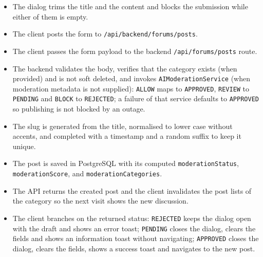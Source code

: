\begin{itemize}[leftmargin=1.6em,topsep=3pt,itemsep=2pt,parsep=0pt,label=$\bullet$]
      \item The dialog trims the title and the content and blocks the submission while
            either of them is empty.
      \item The client posts the form to \texttt{/api/backend/forums/posts}.
      \item The client passes the form payload to the backend \texttt{/api/forums/posts} route.
      \item The backend validates the body, verifies that the category exists (when provided) and is not soft
            deleted, and invokes \texttt{AIModerationService} (when moderation metadata is not supplied): \texttt{ALLOW} maps to \texttt{APPROVED},
            \texttt{REVIEW} to \texttt{PENDING} and \texttt{BLOCK} to \texttt{REJECTED}; a
            failure of that service defaults to \texttt{APPROVED} so publishing is not
            blocked by an outage.
      \item The slug is generated from the title, normalised to lower case without accents,
            and completed with a timestamp and a random suffix to keep it unique.
      \item The post is saved in PostgreSQL with its computed \texttt{moderationStatus}, \texttt{moderationScore}, and \texttt{moderationCategories}.
      \item The API returns the created post and the client invalidates the post lists of
            the category so the next visit shows the new discussion.
      \item The client branches on the returned status: \texttt{REJECTED} keeps the dialog
            open with the draft and shows an error toast; \texttt{PENDING} closes the
            dialog, clears the fields and shows an information toast without navigating;
            \texttt{APPROVED} closes the dialog, clears the fields, shows a success toast
            and navigates to the new post.
\end{itemize}

